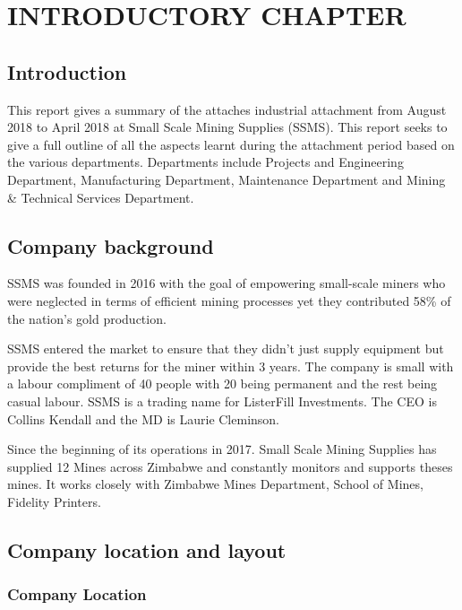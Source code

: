 \chapter{ INTRODUCTORY CHAPTER}


\section{  Introduction}

\noindent This report gives a summary of the attaches industrial attachment from August 2018 to April 2018 at Small Scale Mining Supplies (SSMS). This report seeks to give a full outline of all the aspects learnt during the attachment period based on the various departments. Departments include Projects and Engineering Department, Manufacturing Department, Maintenance Department and Mining \& Technical Services Department.\par

\section{ Company background}

\noindent SSMS was founded in 2016 with the goal of empowering small-scale miners who were neglected in terms of efficient mining processes yet they contributed 58\% of the nation's gold production. \par

\noindent SSMS entered the market to ensure that they didn't just supply equipment but provide the best returns for the miner within 3 years. The company is small with a labour compliment of 40 people with 20 being permanent and the rest being casual labour. SSMS is a trading name for ListerFill Investments. The CEO is Collins Kendall and the MD is Laurie Cleminson. \par

\noindent Since the beginning of its operations in 2017. Small Scale Mining Supplies has supplied 12 Mines across Zimbabwe and constantly monitors and supports theses mines. It works closely with Zimbabwe Mines Department, School of Mines, Fidelity Printers.\par


\section{ Company location and layout}


\subsection{ Company Location}

